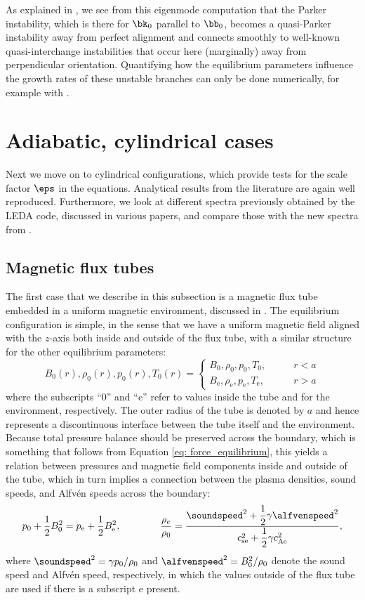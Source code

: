 As explained in \citet{book_MHD}, we see from this eigenmode computation that the Parker instability, which is there for $\bk_0$ parallel to $\bb_0$, becomes a quasi-Parker instability away from perfect alignment and connects smoothly to well-known quasi-interchange instabilities that occur here (marginally) away from perpendicular orientation. Quantifying how the equilibrium parameters influence the growth rates of these unstable branches can only be done numerically, for example with {\legolas}.

\section{Adiabatic, cylindrical cases}
Next we move on to cylindrical configurations, which provide tests for the scale factor $\eps$ in the equations. Analytical results from the literature are again well reproduced. Furthermore, we look at different spectra previously obtained by the LEDA code, discussed in various papers, and compare those with the new spectra from {\legolas}.

\subsection{Magnetic flux tubes}
The first case that we describe in this subsection is a magnetic flux tube embedded in a uniform magnetic environment, discussed in \citet{book_roberts}. The equilibrium configuration is simple, in the sense that we have a uniform magnetic field aligned with the $z$-axis both inside and outside of the flux tube, with a similar structure for the other equilibrium parameters:
\begin{equation}
  B_0(r), \rho_0(r), p_0(r), T_0(r) =
  \begin{cases}
    B_0, \rho_0, p_0, T_0, \qquad &r < a \\
    B_\text{e}, \rho_\text{e}, p_\text{e}, T_\text{e}, \qquad &r > a
  \end{cases}
\end{equation}
where the subscripts ``0'' and ``e'' refer to values inside the tube and for the environment, respectively. The outer radius of the tube is denoted by $a$ and hence represents a discontinuous interface between the tube itself and the environment. Because total pressure balance should be preserved across the boundary, which is something that follows from Equation \eqref{eq: force_equilibrium}, this yields a relation between pressures and magnetic field components inside and outside of the tube, which in turn implies a connection between the plasma densities, sound speeds, and Alfv\'en speeds across the boundary:
\begin{equation} \label{eq: flux_tube_pbalance}
  p_0 + \frac{1}{2}B_0^2 = p_\text{e} + \frac{1}{2}B_\text{e}^2, \qquad\qquad
  \frac{\rho_e}{\rho_0} = \frac{\soundspeed^2 + \dfrac{1}{2}\gamma \alfvenspeed^2}{
    c_\text{se}^2 + \dfrac{1}{2}\gamma c_\text{Ae}^2},
\end{equation}
where $\soundspeed^2 = \gamma p_0 / \rho_0$ and $\alfvenspeed^2 = B_0^2 / \rho_0$ denote the sound speed and Alfv\'en speed, respectively, in which the values outside of the flux tube are used if there is a subscript e present.

